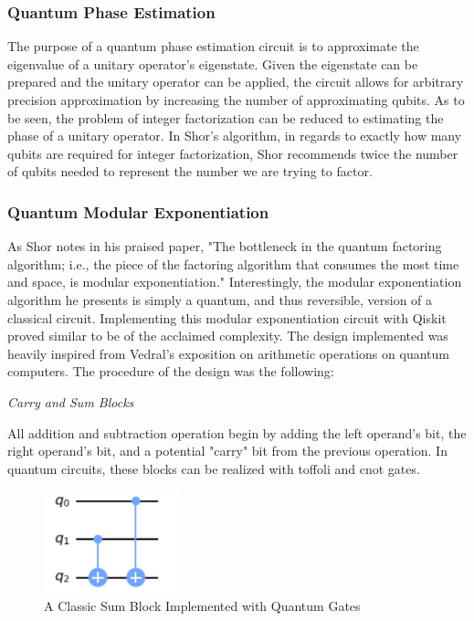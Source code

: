 \documentclass[journal]{IEEEtran}
\begin{document}
\subsubsection{Quantum Phase Estimation}

The purpose of a quantum phase estimation circuit is to approximate the
eigenvalue of a unitary operator's eigenstate. Given the eigenstate can be
prepared and the unitary operator can be applied, the circuit allows for
arbitrary precision approximation by increasing the number of approximating
qubits. As to be seen, the problem of integer factorization can be reduced to
estimating the phase of a unitary operator. In Shor's algorithm, in regards to
exactly how many qubits are required for integer factorization, Shor recommends
twice the number of qubits needed to represent the number we are trying to
factor.

\subsubsection{Quantum Modular Exponentiation}

As Shor notes in his praised paper, "The bottleneck in the quantum factoring
algorithm; i.e., the piece of the factoring algorithm that consumes the most
time and space, is modular exponentiation."\cite{Shor1997} Interestingly, the
modular exponentiation algorithm he presents is simply a quantum, and thus
reversible, version of a classical circuit. Implementing this modular
exponentiation circuit with Qiskit proved similar to be of the acclaimed
complexity. The design implemented was heavily inspired from Vedral's
exposition \cite{Vedral1996} on arithmetic operations on quantum computers. The
procedure of the design was the following:

\emph{Carry and Sum Blocks}

All addition and subtraction operation begin by adding the left operand's bit,
the right operand's bit, and a potential "carry" bit from the previous
operation. In quantum circuits, these blocks can be realized with toffoli and
cnot gates.

\begin{figure}[H]
    \begin{center}
        \includegraphics[width=0.35\textwidth]{Sum.png}
        \caption{\label{fig:Sum} A Classic Sum Block Implemented with Quantum Gates}
    \end{center}
\end{figure}
\end{document}
